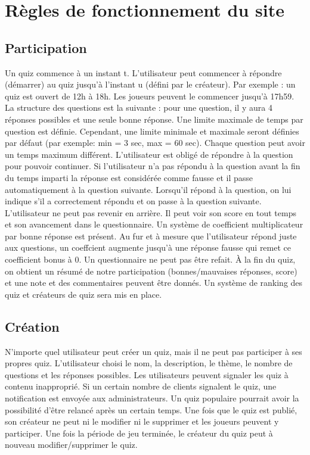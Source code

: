\documentclass[a4paper, 12pt]{article}
\begin{document}
\section{Règles de fonctionnement du site}
\subsection{Participation}
Un quiz commence à un instant t. L'utilisateur peut commencer à répondre (démarrer) au quiz jusqu'à l'instant u (défini par le créateur). Par exemple : un quiz est ouvert de 12h à 18h. Les joueurs peuvent le commencer jusqu'à 17h59.
\bigbreak
La structure des questions est la suivante : pour une question, il y aura 4 réponses possibles et une seule bonne réponse. Une limite maximale de temps par question est définie. Cependant, une limite minimale et maximale seront définies par défaut (par exemple: min = 3 sec, max = 60 sec). Chaque question peut avoir un temps maximum différent.
\bigbreak
L'utilisateur est obligé de répondre à la question pour pouvoir continuer. Si l'utilisateur n'a pas répondu à la question avant la fin du temps imparti la réponse est considérée comme fausse et il passe automatiquement à la question suivante. Lorsqu'il répond à la question, on lui indique s'il a correctement répondu et on passe à la question suivante. L'utilisateur ne peut pas revenir en arrière. Il peut voir son score en tout temps et son avancement dans le questionnaire.
\bigbreak
Un système de coefficient multiplicateur par bonne réponse est présent. Au fur et à mesure que l'utilisateur répond juste aux questions, un coeffcient augmente jusqu'à une réponse fausse qui remet ce coefficient bonus à 0.
\bigbreak
Un questionnaire ne peut pas être refait. À la fin du quiz, on obtient un résumé de notre participation (bonnes/mauvaises réponses, score) et une note et des commentaires peuvent être donnés. Un système de ranking des quiz et créateurs de quiz sera mis en place.
\subsection{Création}
N'importe quel utilisateur peut créer un quiz, mais il ne peut pas participer à ses propres quiz. L'utilisateur choisi le nom, la description, le thème, le nombre de questions et les réponses possibles. Les utilisateurs peuvent signaler les quiz à contenu inapproprié. Si un certain nombre de clients signalent le quiz, une notification est envoyée aux administrateurs.
\bigbreak
Un quiz populaire pourrait avoir la possibilité d'être relancé après un certain temps. Une fois que le quiz est publié, son créateur ne peut ni le modifier ni le supprimer et les joueurs peuvent y participer. Une fois la période de jeu terminée, le créateur du quiz peut à nouveau modifier/supprimer le quiz.
\end{document}
